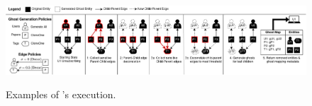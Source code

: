 \begin{figure}[t!]
    \includegraphics[width=.5\textwidth]{img/algo}
    \label{fig:algo}
    \caption{Examples of \sys's execution.}
\end{figure}

%



